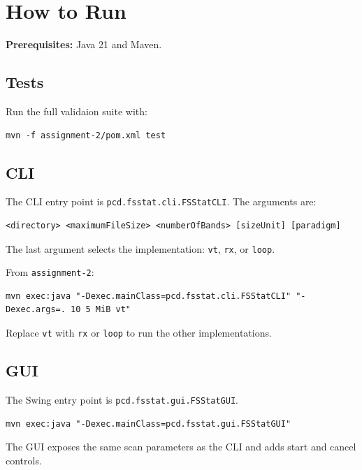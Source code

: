 \clearpage
\section{How to Run}

\textbf{Prerequisites:} Java 21 and Maven.

\subsection{Tests}

Run the full validaion suite with:

\begin{verbatim}
mvn -f assignment-2/pom.xml test
\end{verbatim}

\subsection{CLI}

The CLI entry point is \texttt{pcd.fsstat.cli.FSStatCLI}. The arguments are:

\begin{verbatim}
<directory> <maximumFileSize> <numberOfBands> [sizeUnit] [paradigm]
\end{verbatim}

The last argument selects the implementation: \texttt{vt}, \texttt{rx}, or
\texttt{loop}.

From \texttt{assignment-2}:

\small
\begin{verbatim}
mvn exec:java "-Dexec.mainClass=pcd.fsstat.cli.FSStatCLI" "-Dexec.args=. 10 5 MiB vt"
\end{verbatim}
\normalsize

Replace \texttt{vt} with \texttt{rx} or \texttt{loop} to run the other
implementations.

\subsection{GUI}

The Swing entry point is \texttt{pcd.fsstat.gui.FSStatGUI}.

\small
\begin{verbatim}
mvn exec:java "-Dexec.mainClass=pcd.fsstat.gui.FSStatGUI"
\end{verbatim}
\normalsize

The GUI exposes the same scan parameters as the CLI and adds start and cancel
controls.
